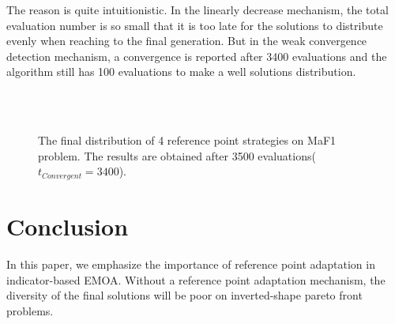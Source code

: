 \documentclass[conference]{IEEEtran}
\begin{document}
The reason is quite intuitionistic.
In the linearly decrease mechanism, the total evaluation number is so small that it is too late for the solutions 
to distribute evenly when reaching to the final generation. 
But in the weak convergence detection mechanism, a convergence is reported after 3400 evaluations and 
the algorithm still has 100 evaluations to make a well solutions distribution. 
\begin{figure}[!t]
  \centering
  \quad
  \\
  \quad
  \\
  \caption{
    The final distribution of 4 reference point strategies on MaF1 problem.
    The results are obtained after 3500 evaluations($t_{Convergent} = 3400$).
  }
  \label{ctdm}
\end{figure} 
\section{Conclusion}
In this paper, we emphasize the importance of reference point adaptation 
in indicator-based EMOA. 
Without a reference point adaptation mechanism, the diversity of the final solutions will be poor
on inverted-shape pareto front problems. 

 
 
\end{document}

